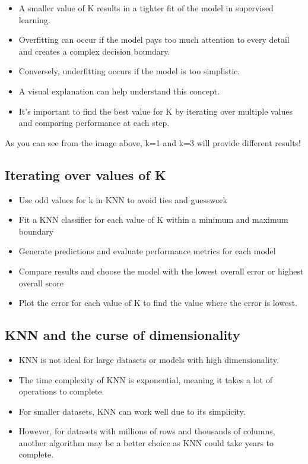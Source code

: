 \documentclass[11pt]{article}
\providecommand{\tightlist}{%
      \setlength{\itemsep}{0pt}\setlength{\parskip}{0pt}}
\begin{document}
\begin{itemize}
\tightlist
\item
  A smaller value of K results in a tighter fit of the model in
  supervised learning.
\item
  Overfitting can occur if the model pays too much attention to every
  detail and creates a complex decision boundary.
\item
  Conversely, underfitting occurs if the model is too simplistic.
\item
  A visual explanation can help understand this concept.
\item
  It's important to find the best value for K by iterating over multiple
  values and comparing performance at each step.
\end{itemize}

As you can see from the image above, k=1 and k=3 will provide different
results!

\hypertarget{iterating-over-values-of-k}{%
\subsection{Iterating over values of
K}\label{iterating-over-values-of-k}}

\begin{itemize}
\tightlist
\item
  Use odd values for k in KNN to avoid ties and guesswork
\item
  Fit a KNN classifier for each value of K within a minimum and maximum
  boundary
\item
  Generate predictions and evaluate performance metrics for each model
\item
  Compare results and choose the model with the lowest overall error or
  highest overall score
\item
  Plot the error for each value of K to find the value where the error
  is lowest.
\end{itemize}

\hypertarget{knn-and-the-curse-of-dimensionality}{%
\subsection{KNN and the curse of
dimensionality}\label{knn-and-the-curse-of-dimensionality}}

\begin{itemize}
\tightlist
\item
  KNN is not ideal for large datasets or models with high
  dimensionality.
\item
  The time complexity of KNN is exponential, meaning it takes a lot of
  operations to complete.
\item
  For smaller datasets, KNN can work well due to its simplicity.
\item
  However, for datasets with millions of rows and thousands of columns,
  another algorithm may be a better choice as KNN could take years to
  complete.
\end{itemize}
\end{document}

